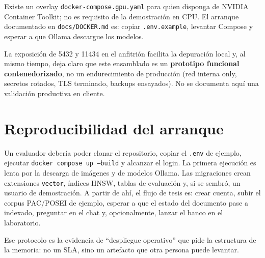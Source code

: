 Existe un overlay \texttt{docker-compose.gpu.yaml} para quien disponga de NVIDIA Container Toolkit; no es requisito de la demostración en CPU. El arranque documentado en \texttt{docs/DOCKER.md} es: copiar \texttt{.env.example}, levantar Compose y esperar a que Ollama descargue los modelos.

La exposición de 5432 y 11434 en el anfitrión facilita la depuración local y, al mismo tiempo, deja claro que este ensamblado es un \textbf{prototipo funcional contenedorizado}, no un endurecimiento de producción (red interna only, secretos rotados, TLS terminado, backups ensayados). No se documenta aquí una validación productiva en cliente.

\section{Reproducibilidad del arranque}
Un evaluador debería poder clonar el repositorio, copiar el \texttt{.env} de ejemplo, ejecutar \texttt{docker compose up --build} y alcanzar el login. La primera ejecución es lenta por la descarga de imágenes y de modelos Ollama. Las migraciones crean extensiones \texttt{vector}, índices HNSW, tablas de evaluación y, si se sembró, un usuario de demostración. A partir de ahí, el flujo de tesis es: crear cuenta, subir el corpus PAC/POSEI de ejemplo, esperar a que el estado del documento pase a indexado, preguntar en el chat y, opcionalmente, lanzar el banco en el laboratorio.

Ese protocolo es la evidencia de ``despliegue operativo'' que pide la estructura de la memoria: no un SLA, sino un artefacto que otra persona puede levantar.
